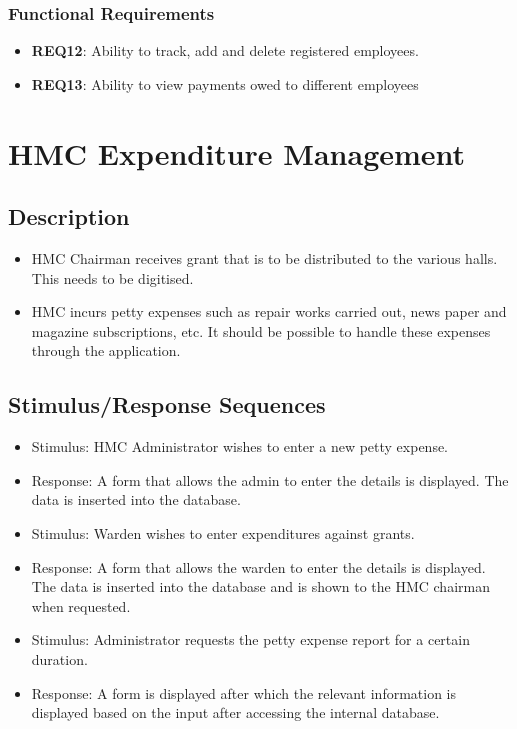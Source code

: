 \documentclass{scrreprt}
\begin{document}
\subsubsection{Functional Requirements}
\begin{itemize}
    \item \textbf{REQ12}: Ability to track, add and delete registered employees.
    \item \textbf{REQ13}: Ability to view payments owed to different employees
\end{itemize}

\section{HMC Expenditure Management}
\subsection{Description}
\begin{itemize}
    \item HMC Chairman receives grant that is to be distributed to the various halls. This needs to be digitised.
    \item HMC incurs petty expenses such as repair works carried out, news paper and magazine subscriptions, etc. It should be possible to handle these expenses through the application.
\end{itemize}
\subsection{Stimulus/Response Sequences}
\begin{itemize}
    \item Stimulus: HMC Administrator wishes to enter a new petty expense.
    \item Response: A form that allows the admin to enter the details is displayed. The data is inserted into the database.
\end{itemize}

\begin{itemize}
    \item Stimulus: Warden wishes to enter expenditures against grants.
    \item Response: A form that allows the warden to enter the details is displayed. The data is inserted into the database and is shown to the HMC chairman when requested.
\end{itemize}

\begin{itemize}
    \item Stimulus: Administrator requests the petty expense report for a certain duration.
    \item Response: A form is displayed after which the relevant information is displayed based on the input after accessing the internal database.
\end{itemize}
\end{document}
